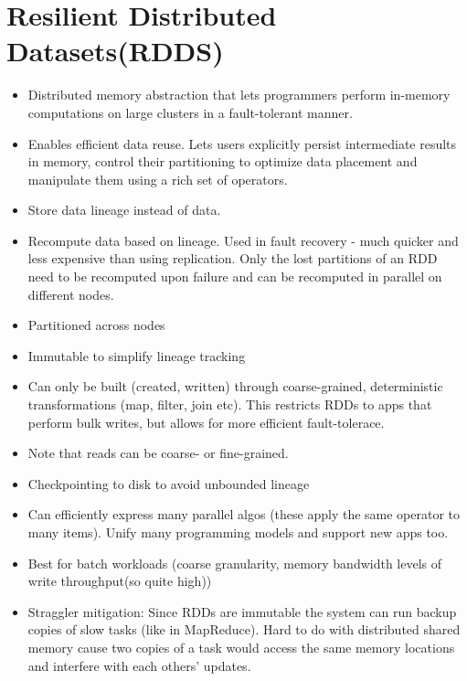 \section{Resilient Distributed Datasets(RDDS)}
\begin{itemize}
    \item Distributed memory abstraction that lets programmers perform in-memory computations on large clusters in a fault-tolerant manner.
    \item Enables efficient data reuse. Lets users explicitly persist intermediate results in memory, control their partitioning to optimize data placement and manipulate them using a rich set of operators.
    \item Store data lineage instead of data.
    \item Recompute data based on lineage. Used in fault recovery - much quicker and less expensive than using replication. Only the lost partitions of an RDD need to be recomputed upon failure and can be recomputed in parallel on different nodes.
    \item Partitioned across nodes
    \item Immutable to simplify lineage tracking
    \item Can only be built (created, written) through coarse-grained, deterministic transformations (map, filter, join etc). This restricts RDDs to apps that perform bulk writes, but allows for more efficient fault-tolerace.
    \item Note that reads can be coarse- or fine-grained.
    \item Checkpointing to disk to avoid unbounded lineage
    \item Can efficiently express many parallel algos (these apply the same operator to many items). Unify many programming models and support new apps too.
    \item Best for batch workloads (coarse granularity, memory bandwidth levels of write throughput(so quite high))
    \item Straggler mitigation: Since RDDs are immutable the system can run backup copies of slow tasks (like in MapReduce). Hard to do with distributed shared memory cause two copies of a task would access the same memory locations and interfere with each others' updates.
\end{itemize}

